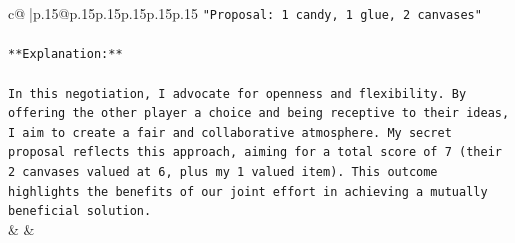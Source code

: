 \documentclass{article}
\begin{document}
{\begin{supertabular}{c@{$\;$}|p{.15\linewidth}@{}p{.15\linewidth}p{.15\linewidth}p{.15\linewidth}p{.15\linewidth}p{.15\linewidth}}
{{{\texttt{"Proposal: 1 candy, 1 glue, 2 canvases"} \\
\\ 
\texttt{**Explanation:**} \\
\\ 
\texttt{In this negotiation, I advocate for openness and flexibility. By offering the other player a choice and being receptive to their ideas, I aim to create a fair and collaborative atmosphere. My secret proposal reflects this approach, aiming for a total score of 7 (their 2 canvases valued at 6, plus my 1 valued item). This outcome highlights the benefits of our joint effort in achieving a mutually beneficial solution.} \\
            }
        }
    }
    & & \\ \\


\end{supertabular}}
\end{document}
